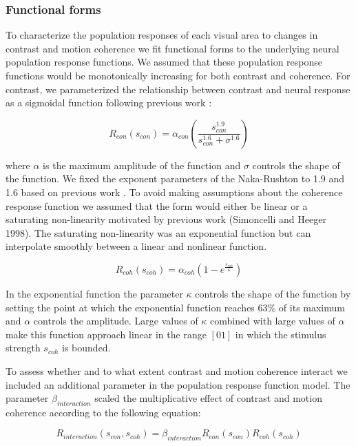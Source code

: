 \subsubsection{Functional forms}

To characterize the population responses of each visual area to changes in contrast and motion coherence we fit functional forms to the underlying neural population response functions. We assumed that these population response functions would be monotonically increasing for both contrast and coherence. For contrast, we parameterized the relationship between contrast and neural response as a sigmoidal function \citep{Naka1966-fh} following previous work \citep{Albrecht1982-rq}:

\begin{equation}
    R_{con}(s_{con})=\alpha_{con}(\frac{s_{con}^{1.9}}{s_{con}^{1.6}+\sigma^{1.6}})
\end{equation}

where $\alpha$ is the maximum amplitude of the function and $\sigma$ controls the shape of the function. We fixed the exponent parameters of the Naka-Rushton to 1.9 and 1.6 based on previous work \citep{Boynton1999-jd}.
To avoid making assumptions about the coherence response function we assumed that the form would either be linear or a saturating non-linearity motivated by previous work \citep{Rees2000-ul} (Simoncelli and Heeger 1998). The saturating non-linearity was an exponential function but can interpolate smoothly between a linear and nonlinear function.

\begin{equation}
R_{coh}(s_{coh})=\alpha_{coh} (1 - e^{\frac{s_{coh}}{\kappa}})
\end{equation}

In the exponential function the parameter $\kappa$ controls the shape of the function by setting the point at which the exponential function reaches 63\% of its maximum and $\alpha$ controls the amplitude. Large values of $\kappa$ combined with large values of $\alpha$ make this function approach linear in the range $[0 1]$ in which the stimulus strength $s_{coh}$ is bounded.

To assess whether and to what extent contrast and motion coherence interact we included an additional parameter in the population response function model. The parameter $\beta_{interaction}$ scaled the multiplicative effect of contrast and motion coherence according to the following equation:

\begin{equation}
    R_{interaction}(s_{con},s_{coh})=\beta_{interaction}R_{con}(s_{con})R_{coh}(s_{coh})
\end{equation}

